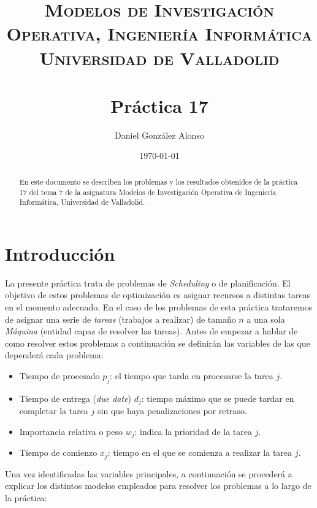 \documentclass[a4paper,11pt]{article}
\title{
	\vspace{-25pt}
	\normalfont \Large \textsc{
		Modelos de Investigación Operativa,
        Ingeniería Informática\\
        Universidad de Valladolid
	}\\[10pt]
	\horrule{1pt}\\[10pt]
	\huge \textbf{
		Práctica 17
	}\\
	\horrule{1pt}
}
\author{
	\normalfont \Large Daniel González Alonso
}
\date{
	\normalfont \large \today
}
\begin{document}
\maketitle

\begin{abstract}
	En este documento se describen los problemas y los resultados obtenidos de la práctica 17 del tema 7 de la asignatura Modelos de Investigación Operativa de Ingeniería Informática, Universidad de Valladolid.
\end{abstract}

\section{Introducción}
La presente práctica trata de problemas de \textit{Scheduling} o de planificación. El objetivo de estos problemas de optimización es asignar recursos a distintas tareas en el momento adecuado. En el caso de los problemas de esta práctica trataremos de asignar una serie de \textit{tareas} (trabajos a realizar) de tamaño $n$ a una sola \textit{Máquina} (entidad capaz de resolver las tareas). Antes de empezar a hablar de como resolver estos problemas a continuación se definirán las variables de las que dependerá cada problema:

\begin{itemize}
	\item Tiempo de procesado ${p_{j}}$: el tiempo que tarda en procesarse la tarea $j$.
	\item Tiempo de entrega (\textit{due date}) ${d_{j}}$: tiempo máximo que se puede tardar en completar la tarea $j$ sin que haya penalizaciones por retraso.
    \item Importancia relativa o peso ${w_{j}}$: indica la prioridad de la tarea $j$.
    \item Tiempo de comienzo ${x_{j}}$: tiempo en el que se comienza a realizar la tarea $j$.
\end{itemize}

Una vez identificadas las variables principales, a continuación se procederá a explicar los distintos modelos empleados para resolver los problemas a lo largo de la práctica:
\end{document}
